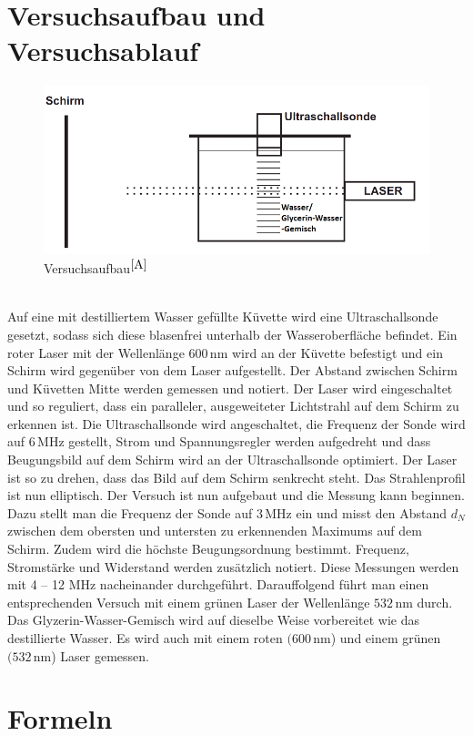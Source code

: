 \documentclass[fontsize=12pt]{scrartcl}
\begin{document}
\section*{ Versuchsaufbau und Versuchsablauf}
\begin{figure}[h]
\includegraphics[scale=0.5]{Graphik/Versuchsaufbau}
\caption{Versuchsaufbau$^{\cite{A}}$}
\end{figure}
~\\
Auf eine mit destilliertem Wasser gefüllte Küvette wird eine Ultraschallsonde gesetzt, sodass sich diese blasenfrei unterhalb der Wasseroberfläche befindet. Ein roter Laser mit der Wellenlänge $600$\,nm wird an der Küvette befestigt und ein Schirm wird gegenüber von dem Laser aufgestellt. Der Abstand zwischen Schirm und Küvetten Mitte werden gemessen und notiert.
Der Laser wird eingeschaltet und so reguliert, dass ein paralleler, ausgeweiteter Lichtstrahl auf dem Schirm zu erkennen ist. Die Ultraschallsonde wird angeschaltet, die Frequenz der Sonde wird auf $6$\,MHz gestellt, Strom und Spannungsregler werden aufgedreht und dass Beugungsbild auf dem Schirm wird an der Ultraschallsonde optimiert. Der Laser ist so zu drehen, dass das Bild auf dem Schirm senkrecht steht. Das Strahlenprofil ist nun elliptisch.
Der Versuch ist nun aufgebaut und die Messung kann beginnen. Dazu stellt man die Frequenz der Sonde auf $3$\,MHz ein und misst den Abstand $d_N$ zwischen dem obersten und untersten zu erkennenden Maximums auf dem Schirm. Zudem wird die höchste Beugungsordnung bestimmt. Frequenz, Stromstärke und Widerstand werden zusätzlich notiert.
Diese Messungen werden mit 4 – 12 MHz nacheinander durchgeführt. Darauffolgend führt man einen entsprechenden Versuch mit einem grünen Laser der Wellenlänge $532$\,nm durch. 
Das Glyzerin-Wasser-Gemisch wird auf dieselbe Weise vorbereitet wie das destillierte Wasser. Es wird auch mit einem roten $(600$\,nm) und einem grünen $(532$\,nm) Laser gemessen.

\newpage
\section{ Formeln}
\end{document}
